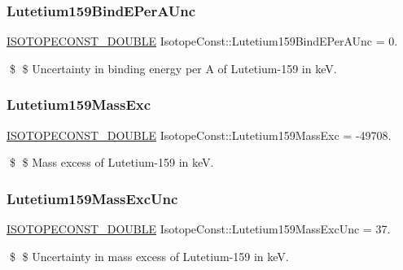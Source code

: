 \subsubsection{\texorpdfstring{Lutetium159\+Bind\+E\+Per\+A\+Unc}{Lutetium159BindEPerAUnc}}
{\footnotesize\ttfamily \mbox{\hyperlink{group___isotope_const-_macros_ga8f45a7272ce02c0b4c65c44636ed719a}{I\+S\+O\+T\+O\+P\+E\+C\+O\+N\+S\+T\+\_\+\+D\+O\+U\+B\+LE}} Isotope\+Const\+::\+Lutetium159\+Bind\+E\+Per\+A\+Unc = 0.}

\$ \$ Uncertainty in binding energy per A of Lutetium-\/159 in keV. \mbox{\label{group___isotope_const-_lutetium-_lu159_ga9607486e5b320b0e4d376101fba529c9}} 
\subsubsection{\texorpdfstring{Lutetium159\+Mass\+Exc}{Lutetium159MassExc}}
{\footnotesize\ttfamily \mbox{\hyperlink{group___isotope_const-_macros_ga8f45a7272ce02c0b4c65c44636ed719a}{I\+S\+O\+T\+O\+P\+E\+C\+O\+N\+S\+T\+\_\+\+D\+O\+U\+B\+LE}} Isotope\+Const\+::\+Lutetium159\+Mass\+Exc = -\/49708.}

\$ \$ Mass excess of Lutetium-\/159 in keV. \mbox{\label{group___isotope_const-_lutetium-_lu159_gae447c2a336edae23793a2fdf74bbc256}} 
\subsubsection{\texorpdfstring{Lutetium159\+Mass\+Exc\+Unc}{Lutetium159MassExcUnc}}
{\footnotesize\ttfamily \mbox{\hyperlink{group___isotope_const-_macros_ga8f45a7272ce02c0b4c65c44636ed719a}{I\+S\+O\+T\+O\+P\+E\+C\+O\+N\+S\+T\+\_\+\+D\+O\+U\+B\+LE}} Isotope\+Const\+::\+Lutetium159\+Mass\+Exc\+Unc = 37.}

\$ \$ Uncertainty in mass excess of Lutetium-\/159 in keV. \mbox{\label{group___isotope_const-_lutetium-_lu159_ga0fcabf930a6543eb909289beb3bccf69}} 
